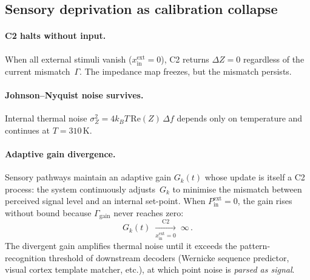 \documentclass[aps,pre,twocolumn,superscriptaddress,floatfix]{revtex4-2}
\begin{document}
\subsection{Sensory deprivation as calibration collapse}
\label{sec:sensory-deprivation}

\paragraph{C2 halts without input.}
When all external stimuli vanish
($x_{\text{in}}^{\text{ext}} = 0$),
C2 returns $\Delta Z = 0$ regardless of the current
mismatch~$\Gamma$.
The impedance map freezes, but the mismatch persists.

\paragraph{Johnson--Nyquist noise survives.}
Internal thermal noise
$\sigma_Z^2 = 4 k_B T\,\text{Re}(Z)\,\Delta f$
depends only on temperature and continues at
$T = 310$\,K.

\paragraph{Adaptive gain divergence.}
Sensory pathways maintain an adaptive gain $G_k(t)$
whose update is itself a C2 process: the system
continuously adjusts~$G_k$ to minimise the mismatch
between perceived signal level and an internal
set-point.
When $P_{\text{in}}^{\text{ext}} = 0$,
the gain rises without bound because $\Gamma_{\text{gain}}$
never reaches zero:
\begin{equation}
  G_k(t)
  \;\xrightarrow[x_{\text{in}}^{\text{ext}}=0]{\text{C2}}
  \;\infty\,.
  \label{eq:gain-divergence}
\end{equation}
The divergent gain amplifies thermal noise until it
exceeds the pattern-recognition threshold of downstream
decoders (Wernicke sequence predictor, visual cortex
template matcher, etc.), at which point noise is
\emph{parsed as signal}.
\end{document}
